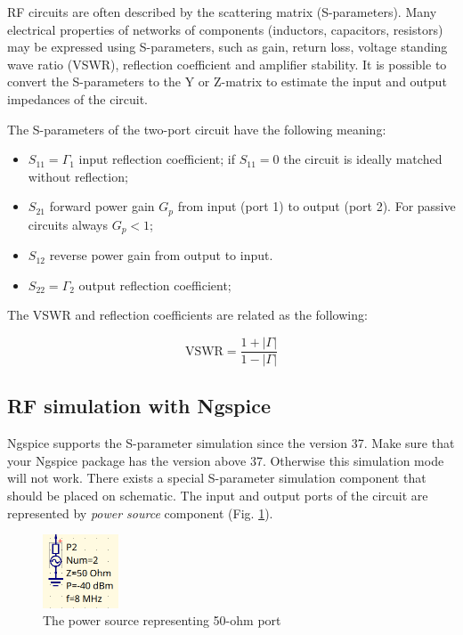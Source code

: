 \documentclass[a4paper,12pt]{article}
\begin{document}
RF circuits are often described by the scattering matrix (S-parameters). Many electrical properties of networks of components (inductors, capacitors, resistors) may be expressed using S-parameters, such as gain, return loss, voltage standing wave ratio (VSWR), reflection coefficient and amplifier stability. It is possible to convert the S-parameters to the Y or Z-matrix to estimate the input and output impedances of the circuit. 

The S-parameters of the two-port circuit have the following meaning:

\begin{itemize}
 \item $S_{11}=\Gamma_1$ input reflection coefficient; if $S_{11}=0$ the circuit is ideally matched without reflection;
 \item $S_{21}$ forward power gain $G_p$ from input (port 1) to output (port 2). For passive circuits always $G_p<1$; 
 \item $S_{12}$ reverse power gain from output to input.
 \item $S_{22}=\Gamma_2$ output reflection coefficient;
\end{itemize}

The VSWR and reflection coefficients are related as the following:

\begin{equation}
 \mathrm{VSWR} = \frac{1+|\Gamma|}{1-|\Gamma|}
\end{equation}

\subsection{RF simulation with Ngspice}

Ngspice supports the S-parameter simulation since the version 37. Make sure that your Ngspice package has the version above 37. Otherwise this simulation mode will not work. There exists a special S-parameter simulation component that should be placed on schematic. The input and output ports of the circuit are represented by \emph{power source} component (Fig. \ref{fig:port50}). 

    \begin{figure}[!ht]
    \begin{center}
        \includegraphics[width=0.2\textwidth]{img/port50.png}
    \end{center}
    \caption{The power source representing 50-ohm port} \label{fig:port50}
    \end{figure}
    
\end{document}
